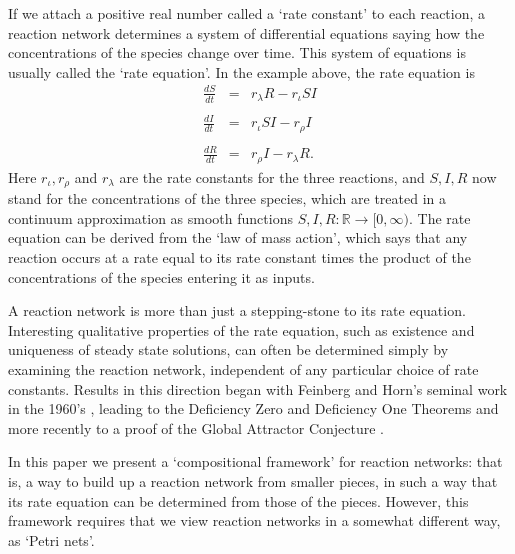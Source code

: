 \documentclass{compositionalityarticle}
\newcommand{\R}{\mathbb{R}}
\newcommand{\maps}{\colon}
\newcommand{\beq}{\begin{equation}}
\newcommand{\eeq}{\end{equation}}
\theoremstyle{compositionality}
\theoremstyle{remark}
\begin{document}
If we attach a positive real number called a `rate constant' to each reaction, a reaction network determines a system of differential equations saying how the concentrations of the species change over time.    This system of equations is usually called 
the `rate equation'.   In the example above, the rate equation is
\beq
\label{SIRS_rate_equation}
\begin{array}{ccl}
\displaystyle{\frac{d S}{d t}} &=& r_\lambda R - r_\iota S I \\ \\
\displaystyle{\frac{d I}{d t}} &=&  r_\iota S I - r_\rho I \\  \\
\displaystyle{\frac{d R}{d t}} &=& r_\rho I - r_\lambda R .
\end{array}
\eeq
Here $r_\iota, r_\rho$ and $r_\lambda$ are the rate constants for the three
reactions, and $S, I, R$ now stand for the concentrations of the three species, which are treated in a continuum approximation as smooth functions $S, I, R \maps \R \to [0,\infty)$.  The rate equation can be derived from the `law of mass action', which says that any reaction occurs at a rate equal to its rate constant times the product of the concentrations of the species entering it as inputs.    

A reaction network is more than just a stepping-stone to its rate equation.  Interesting qualitative properties of the rate equation, such as existence and uniqueness of steady state solutions, can often be determined simply by examining the reaction network, independent of any particular choice of rate constants.  Results in this direction began with  Feinberg and Horn's seminal work in the 1960's \cite{Feinberg,FeinbergHorn}, leading to the Deficiency Zero and Deficiency One Theorems \cite{Feinberg1995a,Feinberg1995b} and more recently to a proof of the Global Attractor Conjecture \cite{Craciun}.     

In this paper we present a `compositional framework' for reaction networks: that is, a way to build up a reaction network from smaller pieces, in such a way that its rate equation can be determined from those of the pieces.   However, this framework requires that we view reaction networks in a somewhat different way, as `Petri nets'.
\end{document}
